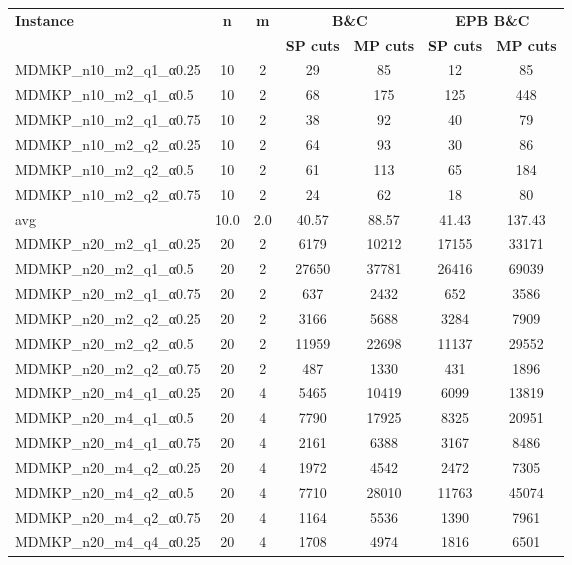 \begin{table}[!ht]
\centering
\hspace*{-1cm}\begin{tabular}{lcccccc}
\toprule
\textbf{Instance} & \textbf{n} & \textbf{m} & \multicolumn{2}{c}{\textbf{B\&C}}  & \multicolumn{2}{c}{\textbf{EPB B\&C}}
\\
\cmidrule(r){4-5} \cmidrule(r){6-7} 
~ & ~ & ~ & \textbf{SP cuts} &\textbf{MP cuts} & \textbf{SP cuts} &\textbf{MP cuts} \\
\midrule

MDMKP\_n10\_m2\_q1\_α0.25 & 10 & 2 & 29 & 85 & 12 & 85 \\
MDMKP\_n10\_m2\_q1\_α0.5 & 10 & 2 & 68 & 175 & 125 & 448 \\
MDMKP\_n10\_m2\_q1\_α0.75 & 10 & 2 & 38 & 92 & 40 & 79 \\
MDMKP\_n10\_m2\_q2\_α0.25 & 10 & 2 & 64 & 93 & 30 & 86 \\
MDMKP\_n10\_m2\_q2\_α0.5 & 10 & 2 & 61 & 113 & 65 & 184 \\
MDMKP\_n10\_m2\_q2\_α0.75 & 10 & 2 & 24 & 62 & 18 & 80 \\
\cline{1-9} avg & 10.0 & 2.0 & 40.57& 88.57 & 41.43& 137.43\\ \hline
MDMKP\_n20\_m2\_q1\_α0.25 & 20 & 2 & 6179 & 10212 & 17155 & 33171 \\
MDMKP\_n20\_m2\_q1\_α0.5 & 20 & 2 & 27650 & 37781 & 26416 & 69039 \\
MDMKP\_n20\_m2\_q1\_α0.75 & 20 & 2 & 637 & 2432 & 652 & 3586 \\
MDMKP\_n20\_m2\_q2\_α0.25 & 20 & 2 & 3166 & 5688 & 3284 & 7909 \\
MDMKP\_n20\_m2\_q2\_α0.5 & 20 & 2 & 11959 & 22698 & 11137 & 29552 \\
MDMKP\_n20\_m2\_q2\_α0.75 & 20 & 2 & 487 & 1330 & 431 & 1896 \\
MDMKP\_n20\_m4\_q1\_α0.25 & 20 & 4 & 5465 & 10419 & 6099 & 13819 \\
MDMKP\_n20\_m4\_q1\_α0.5 & 20 & 4 & 7790 & 17925 & 8325 & 20951 \\
MDMKP\_n20\_m4\_q1\_α0.75 & 20 & 4 & 2161 & 6388 & 3167 & 8486 \\
MDMKP\_n20\_m4\_q2\_α0.25 & 20 & 4 & 1972 & 4542 & 2472 & 7305 \\
MDMKP\_n20\_m4\_q2\_α0.5 & 20 & 4 & 7710 & 28010 & 11763 & 45074 \\
MDMKP\_n20\_m4\_q2\_α0.75 & 20 & 4 & 1164 & 5536 & 1390 & 7961 \\
MDMKP\_n20\_m4\_q4\_α0.25 & 20 & 4 & 1708 & 4974 & 1816 & 6501 \\

\end{tabular}
\end{table}

